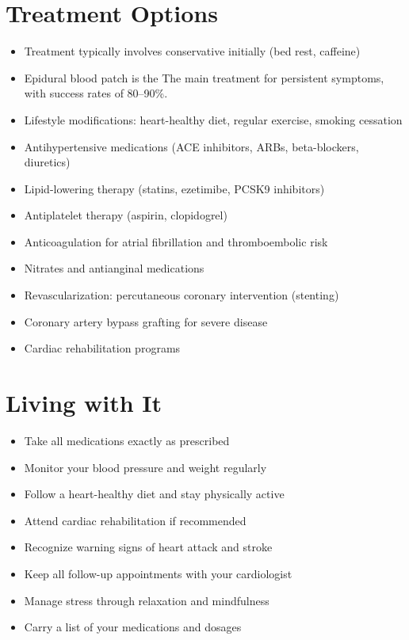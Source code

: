 \section{Treatment Options}
\begin{itemize}[noitemsep]
  \item Treatment typically involves conservative initially (bed rest, caffeine)
  \item Epidural blood patch is the The main treatment for persistent symptoms, with success rates of 80--90\%.
  \item Lifestyle modifications: heart-healthy diet, regular exercise, smoking cessation
  \item Antihypertensive medications (ACE inhibitors, ARBs, beta-blockers, diuretics)
  \item Lipid-lowering therapy (statins, ezetimibe, PCSK9 inhibitors)
  \item Antiplatelet therapy (aspirin, clopidogrel)
  \item Anticoagulation for atrial fibrillation and thromboembolic risk
  \item Nitrates and antianginal medications
  \item Revascularization: percutaneous coronary intervention (stenting)
  \item Coronary artery bypass grafting for severe disease
  \item Cardiac rehabilitation programs
\end{itemize}
\section{Living with It}
\begin{itemize}[noitemsep]
  \item Take all medications exactly as prescribed
  \item Monitor your blood pressure and weight regularly
  \item Follow a heart-healthy diet and stay physically active
  \item Attend cardiac rehabilitation if recommended
  \item Recognize warning signs of heart attack and stroke
  \item Keep all follow-up appointments with your cardiologist
  \item Manage stress through relaxation and mindfulness
  \item Carry a list of your medications and dosages
\end{itemize}

